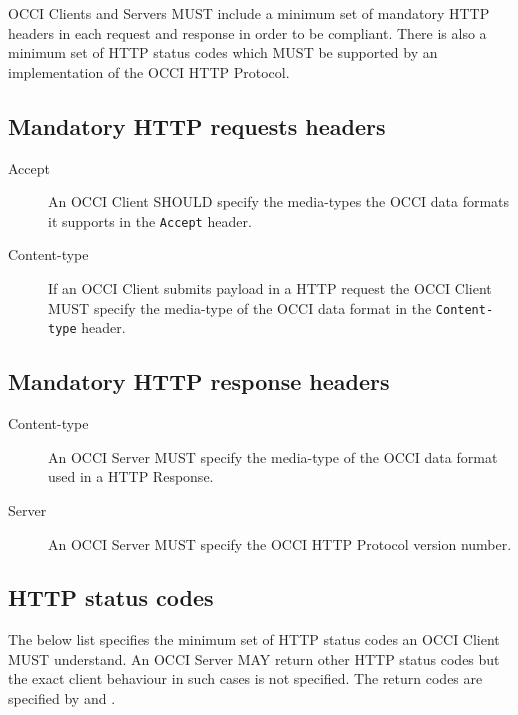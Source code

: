 \documentclass[10pt,a4paper]{article}
\begin{document}
OCCI Clients and Servers MUST include a minimum set of mandatory HTTP headers
in each request and response in order to be compliant.
There is also a minimum set of HTTP status codes which MUST be supported by
an implementation of the OCCI HTTP Protocol.

\subsection{Mandatory HTTP requests headers}

\begin{description}
\item[Accept] An OCCI Client SHOULD specify the media-types the OCCI data
formats it supports in the {\tt Accept} header.

\item[Content-type] If an OCCI Client submits payload in a HTTP request
the OCCI Client MUST specify the media-type of the OCCI data format
in the {\tt Content-type} header.
\end{description}

\subsection{Mandatory HTTP response headers}

\begin{description}
\item[Content-type] An OCCI Server MUST specify the media-type of the OCCI data
format used in a HTTP Response.
\item[Server] An OCCI Server MUST specify the OCCI HTTP Protocol version number.
\end{description}

\subsection{HTTP status codes}
The below list specifies the minimum set of HTTP status codes an OCCI Client MUST
understand. An OCCI Server MAY return other HTTP status codes but the exact client
behaviour in such cases is not specified. The return codes are specified by 
\cite{rfc7231} and \cite{rfc7235}.
\end{document}
